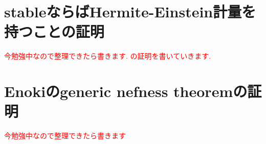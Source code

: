 \documentclass[dvipdfmx,a4paper,11pt]{article} %
\newtheorem{thm}{Theorem}[section]
\theoremstyle{definition}
\theoremstyle{remark}
\numberwithin{equation}{section}
\newcommand{\End}[0]{\operatorname{End}}
\newcommand{\xr}[1]{\textcolor{red}{#1}}
\begin{document}

\section{stableならばHermite-Einstein計量を持つことの証明}
\xr{今勉強中なので整理できたら書きます. \cite{JMS22}の証明を書いていきます.}


\section{Enokiのgeneric nefness theoremの証明}
\xr{今勉強中なので整理できたら書きます}
\end{document}
